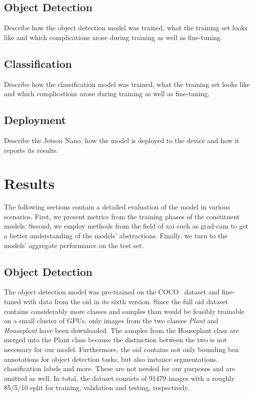 \documentclass[draft,final]{vutinfth} %
\begin{document}
\section{Object Detection}
\label{sec:development-detection}

Describe how the object detection model was trained, what the training
set looks like and which complications arose during training as well
as fine-tuning.

\section{Classification}
\label{sec:Classification}

Describe how the classification model was trained, what the training
set looks like and which complications arose during training as well
as fine-tuning.

\section{Deployment}

Describe the Jetson Nano, how the model is deployed to the device and
how it reports its results.

\chapter{Results}
\label{chap:results}

The following sections contain a detailed evaluation of the model in
various scenarios. First, we present metrics from the training phases
of the constituent models. Second, we employ methods from the field of
\gls{xai} such as \gls{grad-cam} to get a better understanding of the
models' abstractions. Finally, we turn to the models' aggregate
performance on the test set.

\section{Object Detection}
\label{sec:yolo-eval}

The object detection model was pre-trained on the COCO~\cite{lin2015}
dataset and fine-tuned with data from the \gls{oid}
\cite{kuznetsova2020} in its sixth version. Since the full \gls{oid}
dataset contains considerably more classes and samples than would be
feasibly trainable on a small cluster of GPUs, only images from the
two classes \emph{Plant} and \emph{Houseplant} have been
downloaded. The samples from the Houseplant class are merged into the
Plant class because the distinction between the two is not necessary
for our model. Furthermore, the \gls{oid} contains not only bounding
box annotations for object detection tasks, but also instance
segmentations, classification labels and more. These are not needed
for our purposes and are omitted as well. In total, the dataset
consists of 91479 images with a roughly 85/5/10 split for training,
validation and testing, respectively.
\end{document}
